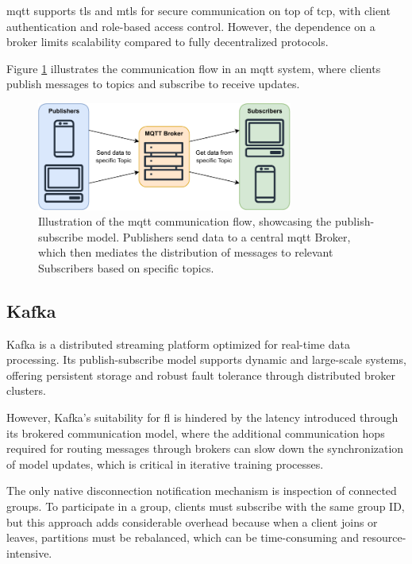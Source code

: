 \ac{mqtt} supports \ac{tls} and \ac{mtls} for secure communication on top of \ac{tcp}, with client authentication and role-based access control. However, the dependence on a broker limits scalability compared to fully decentralized protocols.

Figure \ref{fig:mqtt_comm} illustrates the communication flow in an \ac{mqtt} system, where clients publish messages to topics and subscribe to receive updates.

\begin{figure}[!htb]
    \centering
    \includegraphics[width=0.75\textwidth]{figs/mqtt_comm.pdf}
    \caption[MQTT Communication Flow]{Illustration of the \ac{mqtt} communication flow, showcasing the publish-subscribe model. Publishers send data to a central \ac{mqtt} Broker, which then mediates the distribution of messages to relevant Subscribers based on specific topics.}
    \label{fig:mqtt_comm}
\end{figure}

\subsection{Kafka}
\label{sec:kafka}

Kafka is a distributed streaming platform optimized for real-time data processing. Its publish-subscribe model supports dynamic and large-scale systems, offering persistent storage and robust fault tolerance through distributed broker clusters. 

However, Kafka's suitability for \ac{fl} is hindered by the latency introduced through its brokered communication model, where the additional communication hops required for routing messages through brokers can slow down the synchronization of model updates, which is critical in iterative training processes. 

The only native disconnection notification mechanism is inspection of connected groups. To participate in a group, clients must subscribe with the same group ID, but this approach adds considerable overhead because when a client joins or leaves, partitions must be rebalanced, which can be time-consuming and resource-intensive.

